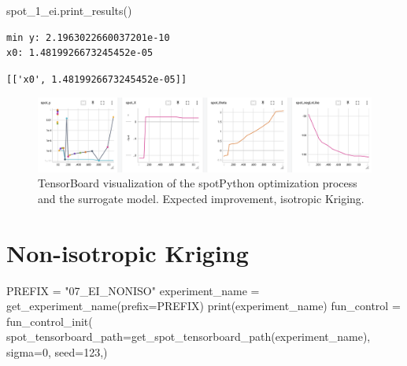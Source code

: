 \documentclass[
  letterpaper,
  DIV=11,
  numbers=noendperiod]{scrreprt}
\newenvironment{Shaded}{\begin{snugshade}}{\end{snugshade}}
\newcommand{\BuiltInTok}[1]{\textcolor[rgb]{0.00,0.23,0.31}{#1}}
\newcommand{\DecValTok}[1]{\textcolor[rgb]{0.68,0.00,0.00}{#1}}
\newcommand{\NormalTok}[1]{\textcolor[rgb]{0.00,0.23,0.31}{#1}}
\newcommand{\OperatorTok}[1]{\textcolor[rgb]{0.37,0.37,0.37}{#1}}
\newcommand{\StringTok}[1]{\textcolor[rgb]{0.13,0.47,0.30}{#1}}
\begin{document}
\begin{Shaded}
\begin{Highlighting}[]
\NormalTok{spot\_1\_ei.print\_results()}
\end{Highlighting}
\end{Shaded}

\begin{verbatim}
min y: 2.1963022660037201e-10
x0: 1.4819926673245452e-05
\end{verbatim}

\begin{verbatim}
[['x0', 1.4819926673245452e-05]]
\end{verbatim}

\begin{figure}

{\centering \includegraphics[width=1\textwidth,height=\textheight]{figures_static/07_tensorboard_EI_ISO.png}

}

\caption{TensorBoard visualization of the spotPython optimization
process and the surrogate model. Expected improvement, isotropic
Kriging.}

\end{figure}

\hypertarget{non-isotropic-kriging}{%
\section{Non-isotropic Kriging}\label{non-isotropic-kriging}}

\begin{Shaded}
\begin{Highlighting}[]
\NormalTok{PREFIX }\OperatorTok{=} \StringTok{"07\_EI\_NONISO"}
\NormalTok{experiment\_name }\OperatorTok{=}\NormalTok{ get\_experiment\_name(prefix}\OperatorTok{=}\NormalTok{PREFIX)}
\BuiltInTok{print}\NormalTok{(experiment\_name)}
\NormalTok{fun\_control }\OperatorTok{=}\NormalTok{ fun\_control\_init(}
\NormalTok{    spot\_tensorboard\_path}\OperatorTok{=}\NormalTok{get\_spot\_tensorboard\_path(experiment\_name),}
\NormalTok{    sigma}\OperatorTok{=}\DecValTok{0}\NormalTok{,}
\NormalTok{    seed}\OperatorTok{=}\DecValTok{123}\NormalTok{,)}
\end{Highlighting}
\end{Shaded}
\end{document}
